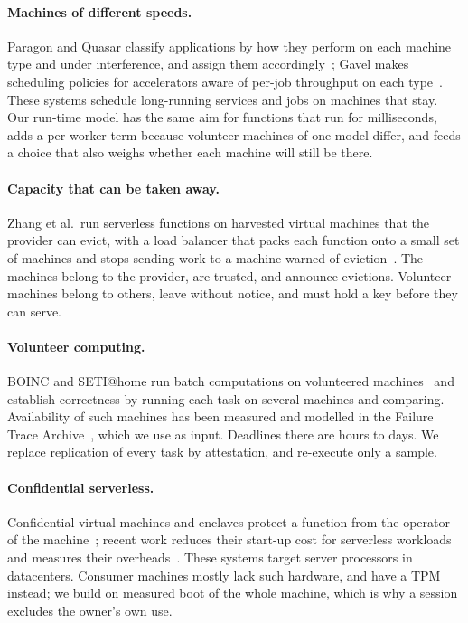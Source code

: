 \paragraph{Machines of different speeds.} Paragon and Quasar classify applications by how they perform on each
machine type and under interference, and assign them accordingly~\cite{delimitrou2013paragon,delimitrou2014quasar};
Gavel makes scheduling policies for accelerators aware of per-job throughput on each
type~\cite{narayanan2020gavel}. These systems schedule long-running services and jobs on machines that stay. Our
run-time model has the same aim for functions that run for milliseconds, adds a per-worker term because volunteer
machines of one model differ, and feeds a choice that also weighs whether each machine will still be there.

\paragraph{Capacity that can be taken away.} Zhang et al.\ run serverless functions on harvested virtual machines
that the provider can evict, with a load balancer that packs each function onto a small set of machines and stops sending work to a machine
warned of eviction~\cite{zhang2021harvest}. The machines belong to
the provider, are trusted, and announce evictions. Volunteer machines belong to others, leave without notice, and
must hold a key before they can serve.

\paragraph{Volunteer computing.} BOINC and SETI@home run batch computations on volunteered
machines~\cite{anderson2004boinc,anderson2002seti} and establish correctness by running each task on several machines
and comparing. Availability of such machines has been measured and modelled in the Failure Trace
Archive~\cite{javadi2013fta,javadi2009seti}, which we use as input. Deadlines there are hours to days. We replace
replication of every task by attestation, and re-execute only a sample.

\paragraph{Confidential serverless.} Confidential virtual machines and enclaves protect a function from the
operator of the machine~\cite{costan2016sgx,amd2020snp,arnautov2016scone}; recent work reduces their start-up cost for
serverless workloads~\cite{holmes2024severifast,segarra2024sesame,wallet2025} and measures their
overheads~\cite{misono2025cvm,li2023bifrost}. These systems target server processors in datacenters. Consumer
machines mostly lack such hardware, and have a TPM instead; we build on measured boot of the whole machine, which is
why a session excludes the owner's own use.

